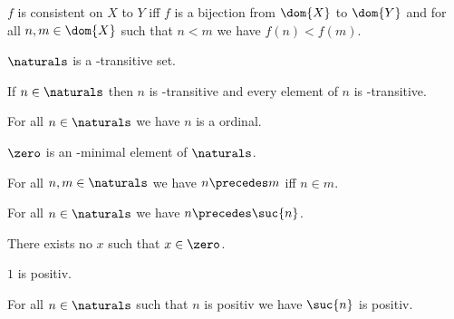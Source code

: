 \begin{definition}\label{bijection_of_urysohnchains}
    $f$ is consistent on $X$ to $Y$ iff $f$ is a bijection from $\dom{X}$ to $\dom{Y}$ and for all $n,m \in \dom{X}$ such that $n < m$ we have $f(n) < f(m)$.
\end{definition}

\begin{proposition}\label{naturals_in_transitive}
    $\naturals$ is a \in-transitive set.
\end{proposition}

\begin{proposition}\label{naturals_elem_in_transitive}
    If $n \in \naturals$ then $n$ is \in-transitive and every element of $n$ is \in-transitive. 
\end{proposition}

\begin{proposition}\label{natural_number_is_ordinal_for_all}
    For all $n \in \naturals$ we have $n$ is a ordinal.
\end{proposition}

\begin{proposition}\label{zero_is_in_minimal}
    $\zero$ is an \in-minimal element of $\naturals$.
\end{proposition}

\begin{proposition}\label{natural_rless_eq_precedes}
    For all $n,m \in \naturals$ we have $n \precedes m$ iff $n \in m$.
\end{proposition}

\begin{proposition}\label{naturals_precedes_suc}
    For all $n \in \naturals$ we have $n \precedes \suc{n}$.
\end{proposition}

\begin{proposition}\label{zero_is_empty}
    There exists no $x$ such that $x \in \zero$.
\end{proposition}

\begin{proposition}\label{one_is_positiv}
    $1$ is positiv.
\end{proposition}

\begin{proposition}\label{suc_of_positive_is_positive}
    For all $n \in \naturals$ such that $n$ is positiv we have $\suc{n}$ is positiv.
\end{proposition}

